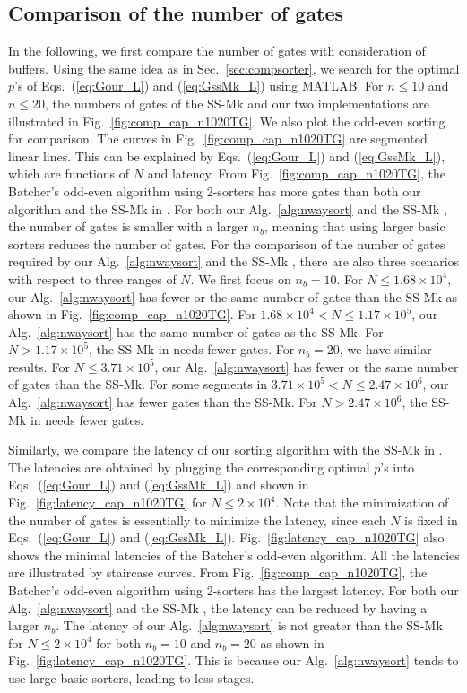 \documentclass[10pt,journal,cspaper,compsoc]{IEEEtran}
\begin{document}
\subsection{Comparison of the number of gates}
In the following, we first compare the number of gates with consideration of buffers.
Using the same idea as in Sec.~\ref{sec:compsorter}, we search for the optimal $p$'s of Eqs.~(\ref{eq:Gour_L}) and (\ref{eq:GssMk_L}) using MATLAB.
For $n\le 10$ and $n\le 20$, the numbers of gates of the SS-Mk and our two implementations are illustrated in Fig.~\ref{fig:comp_cap_n1020TG}. We also plot the odd-even sorting for comparison.
The curves in Fig.~\ref{fig:comp_cap_n1020TG} are segmented linear lines. This can be explained by Eqs.~(\ref{eq:Gour_L}) and (\ref{eq:GssMk_L}), which are functions of $N$ and latency.
From Fig.~\ref{fig:comp_cap_n1020TG}, the Batcher's odd-even algorithm using 2-sorters has more gates than both our algorithm and the SS-Mk in \cite{gao1997sloping}.
For both our Alg.~\ref{alg:nwaysort} and the SS-Mk \cite{gao1997sloping}, the number of gates  is smaller with a larger $n_b$, meaning that using larger basic sorters reduces the number of gates.
For the comparison of the number of gates required by our Alg.~\ref{alg:nwaysort} and the SS-Mk \cite{gao1997sloping}, there are also three scenarios with respect to three ranges of $N$.
We first focus on $n_b = 10$. For $N \le 1.68 \times 10^4$, our Alg.~\ref{alg:nwaysort} has fewer or the same number of gates than the SS-Mk as shown in Fig.~\ref{fig:comp_cap_n1020TG}. For $1.68 \times 10^4 < N \le 1.17 \times 10^5$, our Alg.~\ref{alg:nwaysort} has the same number of gates as the SS-Mk. For $N > 1.17 \times 10^5$, the SS-Mk in \cite{gao1997sloping} needs fewer gates.
For $n_b = 20$, we have similar results.
For $N \le 3.71 \times 10^5$, our Alg.~\ref{alg:nwaysort} has fewer or the same number of gates than the SS-Mk. For some segments in $3.71 \times 10^5 < N \le 2.47 \times 10^6$, our Alg.~\ref{alg:nwaysort} has fewer gates than the SS-Mk. For $N > 2.47 \times 10^6$, the SS-Mk in \cite{gao1997sloping} needs fewer gates.


Similarly, we compare the latency of our sorting algorithm with the SS-Mk in \cite{gao1997sloping}. The latencies are obtained by plugging the corresponding optimal $p$'s into Eqs.~(\ref{eq:Gour_L}) and (\ref{eq:GssMk_L}) and shown in Fig.~\ref{fig:latency_cap_n1020TG} for $N \le 2 \times 10^4$.
Note that the minimization of the number of gates is essentially to minimize the latency, since each $N$ is fixed in Eqs.~(\ref{eq:Gour_L}) and (\ref{eq:GssMk_L}).
Fig.~\ref{fig:latency_cap_n1020TG} also shows the minimal latencies of the Batcher's odd-even algorithm. All the latencies are illustrated by staircase curves. From Fig.~\ref{fig:comp_cap_n1020TG}, the Batcher's odd-even algorithm using 2-sorters has the largest latency.
For both our Alg.~\ref{alg:nwaysort} and the SS-Mk \cite{gao1997sloping}, the latency can be reduced by having a larger $n_b$.
The latency of our Alg.~\ref{alg:nwaysort} is not greater than the SS-Mk for $N \le 2 \times 10^4$ for both $n_b = 10$ and $n_b = 20$ as shown in Fig.~\ref{fig:latency_cap_n1020TG}. This is because our Alg.~\ref{alg:nwaysort} tends to use large basic sorters, leading to less stages.
\end{document}

